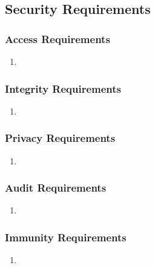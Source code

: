\documentclass[]{article}
\begin{document}

\subsection{Security Requirements}
\label{sub:security_requirements}

\subsubsection{Access Requirements}
\label{ssub:access_requirements}
\begin{enumerate}[{SR-AC}1. ]
	\item 
\end{enumerate}

\subsubsection{Integrity Requirements}
\label{ssub:integrity_requirements}
\begin{enumerate}[{SR-INT}1. ]
	\item 
\end{enumerate}

\subsubsection{Privacy Requirements}
\label{ssub:privacy_requirements}
\begin{enumerate}[{SR-P}1. ]
	\item 
\end{enumerate}

\subsubsection{Audit Requirements}
\label{ssub:audit_requirements}
\begin{enumerate}[{SR-AU}1. ]
	\item 
\end{enumerate}

\subsubsection{Immunity Requirements}
\label{ssub:immunity_requirements}
\begin{enumerate}[{SR-IM}1. ]
	\item 
\end{enumerate}
\end{document}
